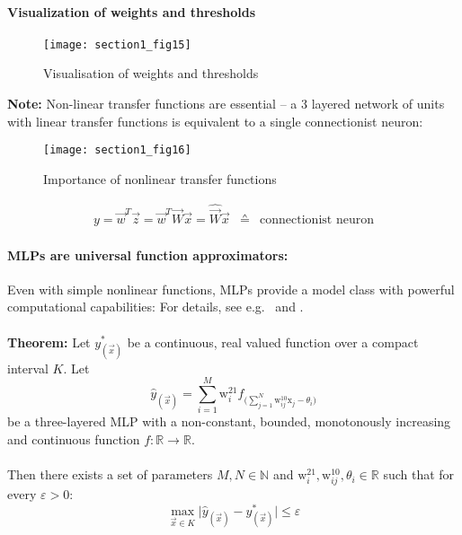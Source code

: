 \paragraph{Visualization of weights and thresholds}

\begin{figure}[h]
  \centering
\texttt{[image: section1\_fig15]}  
  \caption{Visualisation of weights and thresholds}
\end{figure}

\textbf{Note:} Non-linear transfer functions are essential -- a 3
layered network of units with linear transfer functions is equivalent to a single connectionist neuron:
\begin{figure}[h]
  \centering
\texttt{[image: section1\_fig16]}  
  \caption{Importance of nonlinear transfer functions}
\end{figure}

\[ \begin{array}{rcl}
	y = \vec{w}^T \vec{z} = \vec{w}^T \vec{W} \vec{x} 
		= \widehat{\vec{W}} \vec{x} 
	& \corresponds & 
		\text{connectionist neuron}
\end{array} \]

\paragraph{MLPs are universal function approximators:} Even with
simple nonlinear functions, MLPs provide a model class with
powerful computational capabilities: For details, see e.g.\
\textcite{Funahashi1989} and \textcite{HornikEtAl1989}.
\\\\
\textbf{Theorem:} Let $y_{(\vec{x})}^*$ be a continuous, real valued function over a
compact interval $K$. Let
\[ \hat{y}_{(\vec{x})} = \sum_{i=1}^M \mathrm{w}_i^{21} 
	f_{\Big( \sum\limits_{j=1}^N \mathrm{w}_{ij}^{10} 
		\mathrm{x}_j - \theta_i \Big)}
\]
be a three-layered MLP with a non-constant, bounded, monotonously increasing and continuous function $f: \mathbb{R} \rightarrow \mathbb{R}$.
\\\\
Then there exists a set of parameters $M, N \in \mathbb{N}$ and $\mathrm{w}_i^{21}, \mathrm{w}_{ij}^{10}, \theta_i \in \mathbb{R}$ such that for every $\varepsilon > 0$:
\[ \max_{\vec{x} \in K} \Big| \hat{y}_{(\vec{x})} - y_{(\vec{x})}^* \Big| 
	\leq \varepsilon
\]



